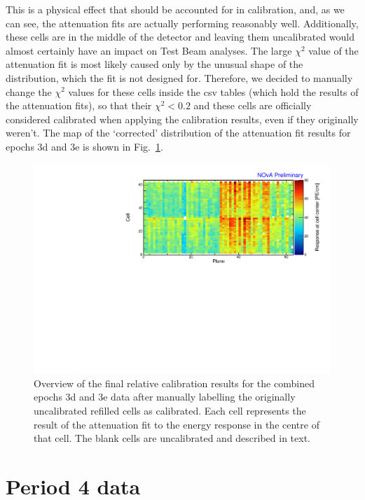 This is a physical effect that should be accounted for in calibration, and, as we can see, the attenuation fits are actually performing reasonably well. Additionally, these cells are in the middle of the detector and leaving them uncalibrated would almost certainly have an impact on Test Beam analyses. The large $\chi^2$ value of the attenuation fit is most likely caused only by the unusual shape of the distribution, which the fit is not designed for. Therefore, we decided to manually change the $\chi^2$ values for these cells inside the csv tables (which hold the results of the attenuation fits), so that their $\chi^2<0.2$ and these cells are officially considered calibrated when applying the calibration results, even if they originally weren't. The map of the `corrected' distribution of the attenuation fit results for epochs 3d and 3e is shown in Fig.~\ref{fig:CellCentreResponseEp3de_updated}.

\begin{figure}[!hbtp]
\centering
\includegraphics[width=\textwidth]{Plots/TBCalibration/CellResponseAtCentre_epoch3de_Limited_NOvAPlotStyle.pdf}
\caption[Corrected map of fitted response at cell centre for epochs 3d and 3e data]{Overview of the final relative calibration results for the combined epochs 3d and 3e data after manually labelling the originally uncalibrated refilled cells as calibrated. Each cell represents the result of the attenuation fit to the energy response in the centre of that cell. The blank cells are uncalibrated and described in text.}
\label{fig:CellCentreResponseEp3de_updated}
\end{figure}

\section{Period 4 data}\label{sec:TBPeriod4}


